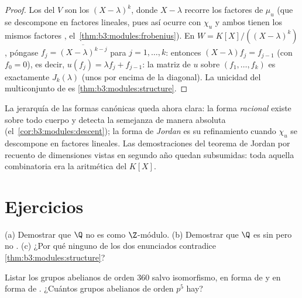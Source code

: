 \begin{proof}
Los  del
 $V$ son los
$(X - \lambda)^k$, donde $X - \lambda$ recorre los factores
 de $\mu_u$ (que se
descompone en factores lineales, pues así ocurre con $\chi_u$ y ambos
tienen los mismos factores
,
el~\cref{thm:b3:modules:frobenius}). En $W = K[X]/((X-\lambda)^k)$,
póngase $f_j = \overline{(X - \lambda)^{k-j}}$ para $j = 1, \dots, k$:
entonces $(X - \lambda)f_j = f_{j-1}$ (con $f_0 = 0$), es decir, $u(f_j)
= \lambda f_j + f_{j-1}$: la matriz de $u$ sobre $(f_1, \dots,
f_k)$ es exactamente $J_k(\lambda)$ (unos por encima de la diagonal). La
unicidad del multiconjunto de
 es
\cref{thm:b3:modules:structure}.
\end{proof}

\begin{remark}\label{rem:b3:modules:overview}
La jerarquía de las formas canónicas queda ahora clara: la forma
\emph{racional} existe sobre todo cuerpo y detecta la semejanza de
manera absoluta (el~\cref{cor:b3:modules:descent}); la forma de
\emph{Jordan} es su refinamiento cuando $\chi_u$ se descompone en
factores lineales. Las demostraciones del teorema de Jordan por recuento
de dimensiones vistas en segundo año quedan subsumidas: toda aquella
combinatoria era la aritmética del 
$K[X]$.
\end{remark}

\section{Ejercicios}

\begin{exercise}[$\star$]\label{exo:b3:modules:1}
(a) Demostrar que $\Q$ no es  como $\Z$-módulo. (b) Demostrar que $\Q$ es
sin  pero no
. (c) ¿Por qué ninguno de los dos
enunciados contradice
\cref{thm:b3:modules:structure}?
\end{exercise}

\begin{exercise}[$\star$]\label{exo:b3:modules:2}
Listar los grupos abelianos de orden $360$ salvo isomorfismo, en forma
de  y en forma de . ¿Cuántos
grupos abelianos de orden $p^5$ hay?
\end{exercise}

